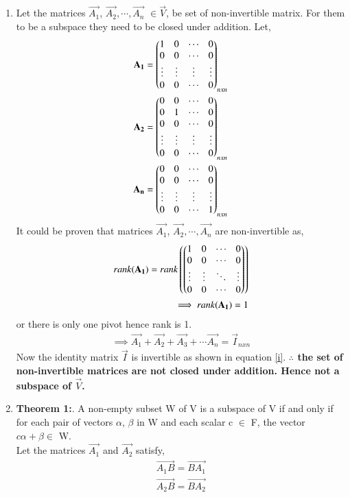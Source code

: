 \documentclass[journal,12pt,twocolumn]{IEEEtran}
\begin{document}
\begin{enumerate}
\item Let the matrices $\vec{A_1}$, $\vec{A_2},\cdots, \vec{A_n}$ $\in \vec{V}$, be set of non-invertible matrix. For them to be a subspace they need to be closed under addition. Let,
\begin{align}
\mathbf{A_1} = \begin{pmatrix}1&0&\cdots&0\\0&0&\cdots&0\\\vdots&\vdots&\vdots&\vdots\\0&0&\cdots&0\end{pmatrix}_{nxn}\\
\mathbf{A_2} = \begin{pmatrix}0&0&\cdots&0\\0&1&\cdots&0\\0&0&\cdots&0\\\vdots&\vdots&\vdots&\vdots\\0&0&\cdots&0\end{pmatrix}_{nxn}\\
\mathbf{A_n}=\begin{pmatrix}0&0&\cdots&0\\0&0&\cdots&0\\\vdots&\vdots&\vdots&\vdots\\0&0&\cdots&1\end{pmatrix}_{nxn}\\
\end{align}  
It could be proven that matrices $\vec{A_1}$, $\vec{A_2}, \cdots, \vec{A_n}$ are non-invertible as,
\begin{align}
rank(\mathbf{A_1}) = rank\left(\begin{pmatrix}1&0&\cdots&0\\0&0&\cdots&0\\\vdots&\vdots&\ddots&\vdots\\0&0&\cdots&0\end{pmatrix}\right)\\
\implies rank(\mathbf{A_1}) = 1
\end{align}
or there is only one pivot hence rank is 1. 
\begin{align}
\implies \vec{A_1}+\vec{A_2}+\vec{A_3}+\cdots\vec{A_n} = \vec{I}_{nxn}
\end{align}
Now the identity matrix $\vec{I}$ is invertible as shown in equation \eqref{i}. \textbf{$\therefore$ the set of non-invertible matrices are not closed under addition. Hence not a subspace of $\vec{V}$.}
\item \textbf{Theorem 1:}. A non-empty subset W of V is a subspace of V if and only if for each pair of vectors $\alpha$, $\beta$ in W and each scalar c $\in$ F, the vector $c\alpha+\beta \in$ W. \\
Let the matrices $\vec{A_1}$ and $\vec{A_2}$ satisfy,
\begin{align}
\vec{A_1B}=\vec{BA_1}\label{s1}\\
\vec{A_2B}=\vec{BA_2}\label{s2}
\end{align}

\end{enumerate}
\end{document}
